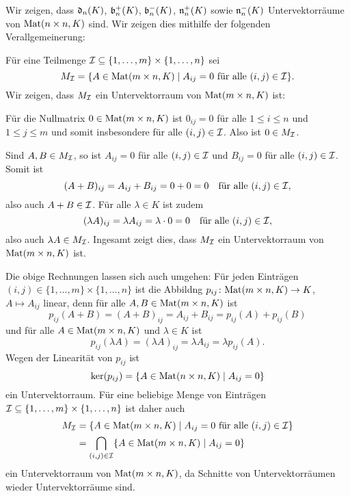 Wir zeigen, dass $\mathfrak{d}_n(K)$, $\mathfrak{b}^+_n(K)$, $\mathfrak{b}^-_n(K)$, $\mathfrak{n}^+_n(K)$ sowie $\mathfrak{n}^-_n(K)$ Untervektorräume von $\mathrm{Mat}(n \times n, K)$ sind. Wir zeigen dies mithilfe der folgenden Verallgemeinerung:

Für eine Teilmenge $\mathcal{I} \subseteq \{1, \dotsc, m\} \times \{1, \dotsc, n\}$ sei
\[
 M_{\mathcal{I}}
 = \{A \in \mathrm{Mat}(m \times n, K) \mid \text{$A_{ij} = 0$ für alle $(i,j) \in \mathcal{I}$}\}.
\]
Wir zeigen, dass $M_{\mathcal{I}}$ ein Untervektorraum von $\mathrm{Mat}(m \times n, K)$ ist:

Für die Nullmatrix $0 \in \mathrm{Mat}(m \times n, K)$ ist $0_{ij} = 0$ für alle $1 \leq i \leq n$ und $1 \leq j \leq m$ und somit insbesondere für alle $(i,j) \in \mathcal{I}$. Also ist $0 \in M_{\mathcal{I}}$.

Sind $A, B \in M_{\mathcal{I}}$, so ist $A_{ij} = 0$ für alle $(i,j) \in \mathcal{I}$ und $B_{ij} = 0$ für alle $(i,j) \in \mathcal{I}$. Somit ist
\[
 (A+B)_{ij}
 = A_{ij} + B_{ij}
 = 0 + 0
 = 0
 \quad
 \text{für alle $(i,j) \in \mathcal{I}$},
\]
also auch $A + B \in \mathcal{I}$. Für alle $\lambda \in K$ ist zudem
\[
 (\lambda A)_{ij}
 = \lambda A_{ij}
 = \lambda \cdot 0
 = 0
 \quad
 \text{für alle $(i,j) \in \mathcal{I}$},
\]
also auch $\lambda A \in M_{\mathcal{I}}$. Ingesamt zeigt dies, dass $M_{\mathcal{I}}$ ein Untervektorraum von $\mathrm{Mat}(m \times n, K)$ ist.

\begin{bem}
 Die obige Rechnungen lassen sich auch umgehen: Für jeden Einträgen $(i,j) \in \{1, \dotsc, m\} \times \{1, \dotsc, n\}$ ist die Abbildng $p_{ij} \colon \mathrm{Mat}(m \times n, K) \to K$, $A \mapsto A_{ij}$ linear, denn für alle $A, B \in \mathrm{Mat}(m \times n, K)$ ist
 \[
  p_{ij}(A+B)
  = (A+B)_{ij}
  = A_{ij} + B_{ij}
  = p_{ij}(A) + p_{ij}(B)
 \]
 und für alle $A \in \mathrm{Mat}(m \times n, K)$ und $\lambda \in K$ ist
 \[
  p_{ij}(\lambda A)
  = (\lambda A)_{ij}
  = \lambda A_{ij}
  = \lambda p_{ij}(A).
 \]
 Wegen der Linearität von $p_{ij}$ ist
 \[
  \ker(p_{ij}) = \{A \in \mathrm{Mat}(n \times n, K) \mid A_{ij} = 0\}
 \]
 ein Untervektorraum. Für eine beliebige Menge von Einträgen $\mathcal{I} \subseteq \{1, \dotsc, m\} \times \{1, \dotsc, n\}$ ist daher auch
 \begin{align*}
  M_{\mathcal{I}}
  &= \{A \in \mathrm{Mat}(m \times n, K) \mid \text{$A_{ij} = 0$ für alle $(i,j) \in \mathcal{I}$}\} \\
  &= \bigcap_{(i,j) \in \mathcal{I}} \{A \in \mathrm{Mat}(m \times n, K) \mid A_{ij} = 0\}
 \end{align*}
 ein Untervektorraum von $\mathrm{Mat}(m \times n, K)$, da Schnitte von Untervektorräumen wieder Untervektorräume sind.
\end{bem}

